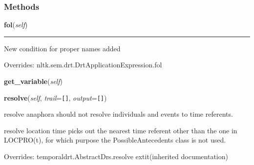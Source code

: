   \subsubsection{Methods}

    \vspace{0.5ex}

\hspace{.8\funcindent}\begin{boxedminipage}{\funcwidth}

    \raggedright \textbf{fol}(\textit{self})

    \vspace{-1.5ex}

    \rule{\textwidth}{0.5\fboxrule}
\setlength{\parskip}{2ex}
    New condition for proper names added

\setlength{\parskip}{1ex}
      Overrides: nltk.sem.drt.DrtApplicationExpression.fol

    \end{boxedminipage}

    \label{temporaldrt:DrtProperNameApplicationExpression:get_variable}

    \vspace{0.5ex}

\hspace{.8\funcindent}\begin{boxedminipage}{\funcwidth}

    \raggedright \textbf{get\_variable}(\textit{self})

\setlength{\parskip}{2ex}
\setlength{\parskip}{1ex}
    \end{boxedminipage}

    \vspace{0.5ex}

\hspace{.8\funcindent}\begin{boxedminipage}{\funcwidth}

    \raggedright \textbf{resolve}(\textit{self}, \textit{trail}={\tt \texttt{[}\texttt{]}}, \textit{output}={\tt \texttt{[}\texttt{]}})

\setlength{\parskip}{2ex}
    resolve anaphora should not resolve individuals and events to time 
    referents.

    resolve location time picks out the nearest time referent other than 
    the one in LOCPRO(t), for which purpose the PossibleAntecedents class 
    is not used.

\setlength{\parskip}{1ex}
      Overrides: temporaldrt.AbstractDrs.resolve 	extit{(inherited documentation)}

    \end{boxedminipage}


